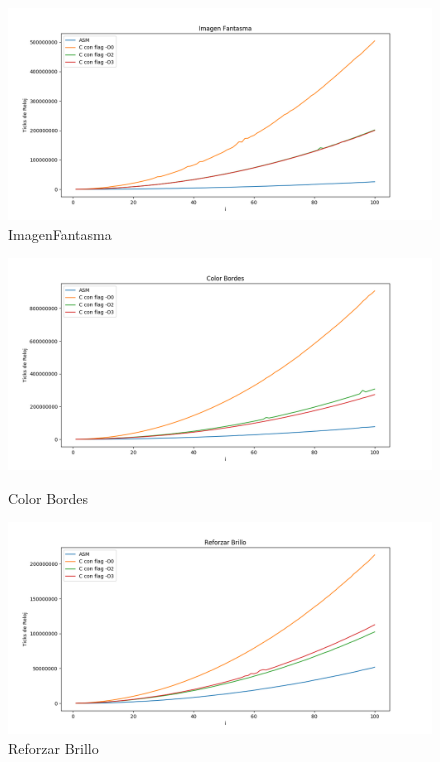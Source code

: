 \documentclass[a4paper]{article}
\begin{document}
	\begin{figure}[h!]			
			\includegraphics[width=\linewidth]{img/imagenFantasma.png}
			\caption{ImagenFantasma}
	\end{figure}


\begin{figure}[h!]			
	\includegraphics[width=\linewidth]{img/colorBordes.png}
	\caption{Color Bordes}
	\includegraphics[width=\linewidth]{img/reforzarBrillo.png}
	\caption{Reforzar Brillo}
\end{figure}
\end{document}
